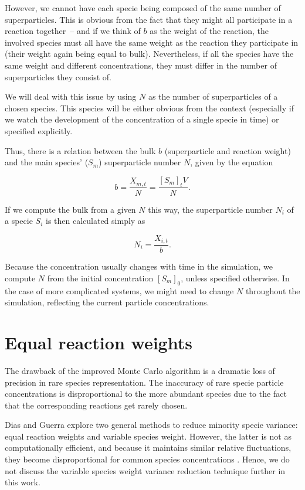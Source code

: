 However, we cannot have each specie being composed of the same number of superparticles. This is obvious from the fact that they might all participate in a reaction together~-- and if we think of $b$ as the weight of the reaction, the involved species must all have the same weight as the reaction they participate in (their weight again being equal to bulk). Nevertheless, if all the species have the same weight and different concentrations, they must differ in the number of superparticles they consist of.

We will deal with this issue by using $N$ as the number of superparticles of a chosen species. This species will be either obvious from the context (especially if we watch the development of the concentration of a single specie in time) or specified explicitly. 

Thus, there is a relation between the bulk $b$ (superparticle and reaction weight) and the main species' ($S_m$) superparticle number $N$, given by the equation

$$b = \frac{X_{m, t}}{N} = \frac{\left[ S_m\right]_t V}{N}.$$

If we compute the bulk from a given $N$ this way, the superparticle number $N_i$ of a specie $S_i$ is then calculated simply as 

$$N_i = \frac{X_{i, t}}{b}.$$

Because the concentration usually changes with time in the simulation, we compute $N$ from the initial concentration $\left[S_m\right]_0$, unless specified otherwise. In the case of more complicated systems, we might need to change $N$ throughout the simulation, reflecting the current particle concentrations. 

\section{Equal reaction weights}

The drawback of the improved Monte Carlo algorithm is a dramatic loss of precision in rare species representation. The inaccuracy of rare specie particle concentrations is disproportional to the more abundant species due to the fact that the corresponding reactions get rarely chosen.

Dias and Guerra explore two general methods to reduce minority specie variance: equal reaction weights and variable species weight. However, the latter is not as computationally efficient, and because it maintains similar relative fluctuations, they become disproportional for common species concentrations \cite{tiago20}. Hence, we do not discuss the variable species weight variance reduction technique further in this work. 


